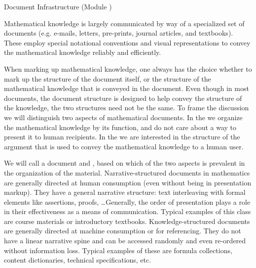 
\begin{omgroup}[id=omdoc-infrastructure,short=Document Infrastructure]
                          {Document Infrastructure (Module {})}

\begin{module}[id=document-types]
Mathematical knowledge is largely communicated by way of a specialized set of documents
(e.g. e-mails, letters, pre-prints, journal articles, and textbooks).  These employ
special notational conventions and visual representations to convey the mathematical
knowledge reliably and efficiently.

When marking up mathematical knowledge, one always has the choice whether to mark up the
structure of the document itself, or the structure of the mathematical knowledge that is
conveyed in the document. Even though in most documents, the document structure is
designed to help convey the structure of the knowledge, the two structures need not be the
same.  To frame the discussion we will distinguish two aspects of mathematical
documents. In the {\emph{}} we organize the mathematical
knowledge by its function, and do not care about a way to present it to human
recipients. In the {\emph{}} we are interested in the
structure of the argument that is used to convey the mathematical knowledge to a human
user.

\begin{definition}[display=flow,id=knowledge-structured.def]
  We will call a document  and
  , based on which of the two aspects is prevalent in the
  organization of the material.  Narrative-structured documents in mathematics are
  generally directed at human consumption (even without being in presentation
  markup). They have a general narrative structure: text interleaving with formal elements
  like assertions, proofs, \ldots Generally, the order of presentation plays a role in
  their effectiveness as a means of communication.  Typical examples of this class are
  course materials or introductory textbooks.  Knowledge-structured documents are
  generally directed at machine consumption or for referencing. They do not have a linear
  narrative spine and can be accessed randomly and even re-ordered without information
  loss.  Typical examples of these are formula collections, {\openmath} content
  dictionaries, technical specifications, etc.
\end{definition}


\end{module}
\end{omgroup}
